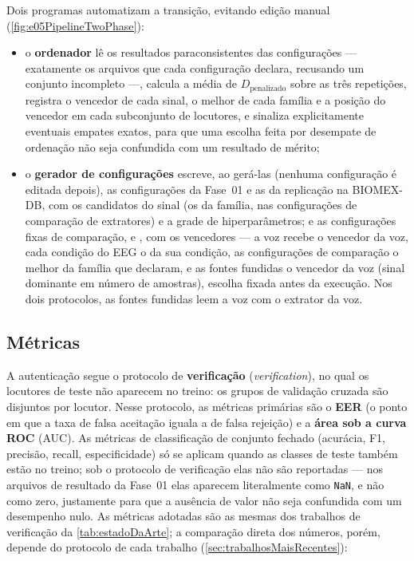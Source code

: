 				\par Dois programas automatizam a transição, evitando edição manual (\autoref{fig:e05PipelineTwoPhase}):
				\begin{itemize}
					\item o \textbf{ordenador} lê os resultados paraconsistentes das  configurações --- exatamente os arquivos que cada configuração declara, recusando um conjunto incompleto ---, calcula a média de $D_{\text{penalizado}}$ sobre as três repetições, registra o vencedor de cada sinal, o melhor de cada família e a posição do vencedor em cada subconjunto de locutores, e sinaliza explicitamente eventuais empates exatos, para que uma escolha feita por desempate de ordenação não seja confundida com um resultado de mérito;
					\item o \textbf{gerador de configurações} escreve, ao gerá-las (nenhuma configuração é editada depois), as  configurações da Fase~01 e as  da replicação na BIOMEX-DB, com os candidatos do sinal (os da família, nas configurações de comparação de extratores) e a grade de hiperparâmetros; e as configurações fixas de comparação,  e , com os vencedores --- a voz recebe o vencedor da voz, cada condição do EEG o da sua condição, as configurações de comparação o melhor da família que declaram, e as fontes fundidas o vencedor da voz (sinal dominante em número de amostras), escolha fixada antes da execução. Nos dois protocolos, as fontes fundidas leem a voz com o extrator da voz.
				\end{itemize}

		\subsection{Métricas}
		
			\par A autenticação segue o protocolo de \textbf{verificação} (\textit{verification}), no qual os locutores de teste não aparecem no treino: os grupos de validação cruzada são disjuntos por locutor. Nesse protocolo, as métricas primárias são o \textbf{\ac{EER}} (o ponto em que a taxa de falsa aceitação iguala a de falsa rejeição) e a \textbf{área sob a curva \ac{ROC}} (\ac{AUC}). As métricas de classificação de conjunto fechado (acurácia, F1, precisão, recall, especificidade) só se aplicam quando as classes de teste também estão no treino; sob o protocolo de verificação elas não são reportadas --- nos arquivos de resultado da Fase~01 elas aparecem literalmente como \texttt{NaN}, e não como zero, justamente para que a ausência de valor não seja confundida com um desempenho nulo. As métricas adotadas são as mesmas dos trabalhos de verificação da \autoref{tab:estadoDaArte}; a comparação direta dos números, porém, depende do protocolo de cada trabalho (\autoref{sec:trabalhosMaisRecentes}):


